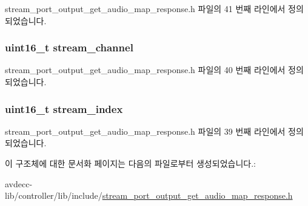 stream\+\_\+port\+\_\+output\+\_\+get\+\_\+audio\+\_\+map\+\_\+response.\+h 파일의 41 번째 라인에서 정의되었습니다.

\subsubsection[{\texorpdfstring{stream\+\_\+channel}{stream_channel}}]{\setlength{\rightskip}{0pt plus 5cm}uint16\+\_\+t stream\+\_\+channel}\hypertarget{structavdecc__lib_1_1stream__port__output__audio__mapping_a99de82258f8163098a8ff558abf07af7}{}\label{structavdecc__lib_1_1stream__port__output__audio__mapping_a99de82258f8163098a8ff558abf07af7}


stream\+\_\+port\+\_\+output\+\_\+get\+\_\+audio\+\_\+map\+\_\+response.\+h 파일의 40 번째 라인에서 정의되었습니다.

\subsubsection[{\texorpdfstring{stream\+\_\+index}{stream_index}}]{\setlength{\rightskip}{0pt plus 5cm}uint16\+\_\+t stream\+\_\+index}\hypertarget{structavdecc__lib_1_1stream__port__output__audio__mapping_acad3919f1d34fc0ae26a5508175defb1}{}\label{structavdecc__lib_1_1stream__port__output__audio__mapping_acad3919f1d34fc0ae26a5508175defb1}


stream\+\_\+port\+\_\+output\+\_\+get\+\_\+audio\+\_\+map\+\_\+response.\+h 파일의 39 번째 라인에서 정의되었습니다.



이 구조체에 대한 문서화 페이지는 다음의 파일로부터 생성되었습니다.\+:\begin{DoxyCompactItemize}
\item 
avdecc-\/lib/controller/lib/include/\hyperlink{stream__port__output__get__audio__map__response_8h}{stream\+\_\+port\+\_\+output\+\_\+get\+\_\+audio\+\_\+map\+\_\+response.\+h}\end{DoxyCompactItemize}
